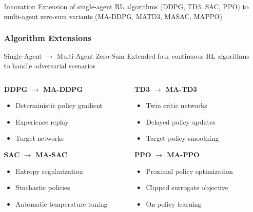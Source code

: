 \documentclass[
    11pt, %
    aspectratio=169, %
]{beamer}
\begin{document}
\begin{frame}
	\begin{exampleblock}{Innovation}
		Extension of single-agent RL algorithms (DDPG, TD3, SAC, PPO) to multi-agent zero-sum variants (MA-DDPG, MATD3, MASAC, MAPPO)
	\end{exampleblock}
\end{frame}

\begin{frame}
	\frametitle{Algorithm Extensions}
	
	\begin{block}{Single-Agent $\rightarrow$ Multi-Agent Zero-Sum}
		Extended four continuous RL algorithms to handle adversarial scenarios
	\end{block}
	
	\begin{columns}[t]
		\begin{column}{0.5\textwidth}
			\textbf{DDPG $\rightarrow$ MA-DDPG}
			\begin{itemize}
				\item Deterministic policy gradient
				\item Experience replay
				\item Target networks
			\end{itemize}
			
			\textbf{SAC $\rightarrow$ MA-SAC}
			\begin{itemize}
				\item Entropy regularization
				\item Stochastic policies
				\item Automatic temperature tuning
			\end{itemize}
		\end{column}
		\begin{column}{0.5\textwidth}
			\textbf{TD3 $\rightarrow$ MA-TD3}
			\begin{itemize}
				\item Twin critic networks
				\item Delayed policy updates
				\item Target policy smoothing
			\end{itemize}
			
			\textbf{PPO $\rightarrow$ MA-PPO}
			\begin{itemize}
				\item Proximal policy optimization
				\item Clipped surrogate objective
				\item On-policy learning
			\end{itemize}
		\end{column}
	\end{columns}
\end{frame}
\end{document}
